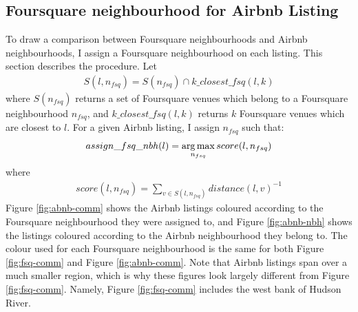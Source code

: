 \subsection{Foursquare neighbourhood for Airbnb Listing}
To draw a comparison between Foursquare neighbourhoods and Airbnb neighbourhoods, I assign a Foursquare neighbourhood on each listing. This section describes the procedure.
Let
\begin{align*}
S(l, n_{fsq}) = S(n_{fsq}) \cap k\_closest\_fsq(l, k)
\end{align*}
where $S(n_{fsq})$ returns a set of Foursquare venues which belong to a Foursquare neighbourhood $n_{fsq}$, and $k\_closest\_fsq(l, k)$ returns $k$ Foursquare venues which are closest to $l$. For a given Airbnb listing, I assign $n_{fsq}$ such that:
\begin{align*}
assign\_fsq\_nbh(l) = \operatorname*{arg\,max}_{n_{fsq}} score(l, n_{fsq})
\end{align*}
where
\begin{align*}
score(l, n_{fsq}) =  \sum_{v \in S(l, n_{fsq})}distance(l, v)^{-1}
\end{align*}
Figure \ref{fig:abnb-comm} shows the Airbnb listings coloured according to the Foursquare neighbourhood they were assigned to, and Figure \ref{fig:abnb-nbh} shows the listings coloured according to the Airbnb neighbourhood they belong to. The colour used for each Foursquare neighbourhood is the same for both Figure \ref{fig:fsq-comm} and Figure \ref{fig:abnb-comm}. Note that Airbnb listings span over a much smaller region, which is why these figures look largely different from Figure \ref{fig:fsq-comm}. Namely, Figure \ref{fig:fsq-comm} includes the west bank of Hudson River. 
